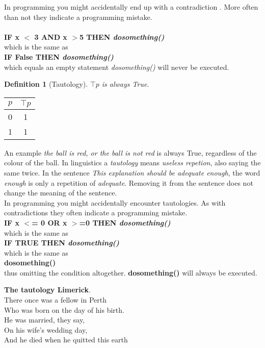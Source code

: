\documentclass[10pt,a4paper,draft,titlepage,onecolumn]{book}
\newtheorem{definition}{Definition}[section]
\begin{document}
In programming you might accidentally end up with a contradiction . More often than not they indicate a programming mistake. \\ \\
\textbf{IF x $<$ 3 AND  x $>$5  THEN \textit{dosomething()}}\\
which is the same as \\
\textbf{IF False THEN \textit{dosomething()}}\\
which equals an empty statement \textit{dosomething()} will never be executed.
\begin{definition}[Tautology]
$\top p $ is always True.
\end{definition}
\begin{center}
\begin{tabular}{ |c|c| }
 \hline
 $p$ & $\top p$  \\
 \hline
 0 & 1 \\
 1 & 1\\
 \hline
\end{tabular} 
\end{center} 
An example \textit{the ball is red, or the ball is not red} is always True, regardless of the colour of the ball.
In linguistics a \textit {tautology} means \textit{useless repetion}, also {saying the same twice}. In the sentence \textit{This explanation should be adequate enough}, the word \textit{enough} is only a repetition of \textit{adequate}. Removing it from the sentence does not change the meaning of the sentence. \\
In programming you might accidentally encounter tautologies. As with contradictions they often indicate a programming mistake. \\
\textbf{IF x $<$= 0 OR  x $>$=0 THEN \textit{dosomething()}}\\
which is the same as \\
\textbf{IF TRUE THEN \textit{dosomething()}}\\
which is the same as \\
\textbf{dosomething()}\\
thus omitting the condition altogether. \textbf{dosomething()} will always be executed.

\begin{center} 
\textbf{The tautology Limerick}.\\
There once was a fellow in Perth \\
Who was born on the day of his birth. \\
He was married, they say, \\
On his wife's wedding day, \\
And he died when he quitted this earth 
\end{center}
\end{document}
